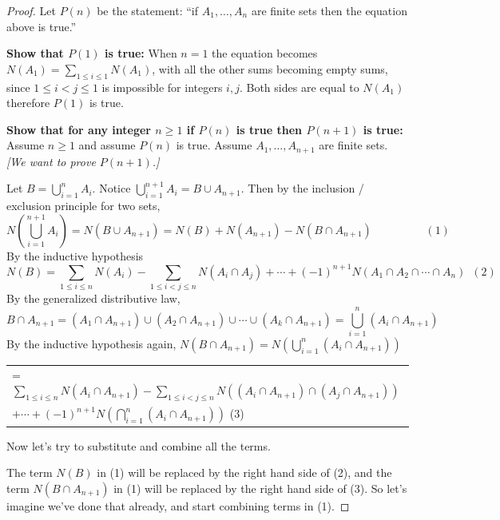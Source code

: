 \documentclass[14pt]{extarticle}
\newcommand{\dps}{\displaystyle}
\begin{document}
\begin{proof}
     Let \(P(n)\) be the statement: ``if \(A_1, \ldots, A_n\) are finite sets then the equation above is true.''

     {\bf Show that \(P(1)\) is true:} When \(n=1\) the equation becomes \(N(A_1) = \sum_{1 \leq i \leq 1} N(A_1)\), with
     all the other sums becoming empty sums, since \(1 \leq i < j \leq 1\) is impossible for integers $i,j$. Both sides are
     equal to \(N(A_1)\) therefore $P(1)$ is true.

          {\bf Show that for any integer \(n \geq 1\) if \(P(n)\) is true then \(P(n+1)\) is true:} Assume \(n \geq 1\) and
     assume \(P(n)\) is true. Assume \(A_1, \ldots, A_{n+1}\) are finite sets. {\it [We want to prove \(P(n+1)\).]}

     Let \(B = \bigcup_{i=1}^n A_i\). Notice \(\bigcup_{i=1}^{n+1}A_i = B \cup A_{n+1}\). Then by the inclusion / exclusion principle for two sets,
     \[
          N\left(\bigcup_{i=1}^{n+1}A_i\right) = N(B \cup A_{n+1}) = N(B) + N(A_{n+1}) - N(B \cap A_{n+1}) \hspace{2cm} (1)
     \]
     By the inductive hypothesis
     \[
          N(B) = \sum_{1 \leq i \leq n} N(A_i) - \sum_{1 \leq i < j \leq n} N(A_i \cap A_j) + \cdots + (-1)^{n+1} N(A_1 \cap A_2 \cap \cdots \cap A_n) \,\,\, (2)
     \]
     By the generalized distributive law,
     \[
          B \cap A_{n+1} = (A_1 \cap A_{n+1}) \cup (A_2 \cap A_{n+1}) \cup \cdots \cup (A_k \cap A_{n+1}) = \bigcup_{i=1}^{n}
          (A_i \cap A_{n+1})
     \]
     By the inductive hypothesis again, \(N(B \cap A_{n+1}) = N\left(\bigcup_{i=1}^{n} (A_i \cap A_{n+1}) \right)\)
     \begin{center}
          \begin{tabular}{l}
               = \(\dps \sum_{1 \leq i \leq n} N(A_i \cap A_{n+1}) - \sum_{1 \leq i < j \leq n} N((A_i \cap A_{n+1}) \cap
               (A_j \cap A_{n+1}))\) \\
               \(\dps + \cdots + (-1)^{n+1}N\left(\bigcap_{i=1}^n (A_i \cap A_{n+1})\right)\) \hspace{4cm} (3)
          \end{tabular}
     \end{center}
     Now let's try to substitute and combine all the terms.

     The term \(N(B)\) in (1) will be replaced by the right hand side of (2), and the term \(N(B \cap A_{n+1})\) in (1) will
     be replaced by the right hand side of (3). So let's imagine we've done that already, and start combining terms in (1).


\end{proof}
\end{document}
